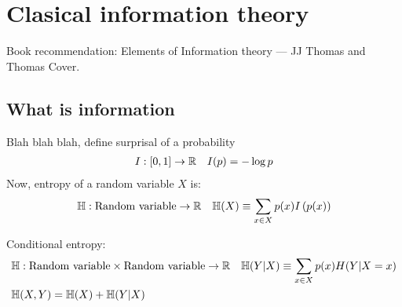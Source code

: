 \chapter{Clasical information theory}
Book recommendation: Elements of Information theory --- JJ Thomas and Thomas Cover.

\section{What is information}
Blah blah blah, define surprisal of a probability 
\begin{align*}
    I: [0, 1] \rightarrow \mathbb{R} \quad
    I(p) = - \log p
\end{align*}
Now, entropy of a random variable $X$ is:
\begin{align*}
    \mathbb{H} : \text{Random variable} \rightarrow \mathbb{R} \quad
    \mathbb{H}(X) \equiv \sum_{x \in X} p(x) I\left(p(x)\right)
\end{align*}

Conditional entropy:
\begin{align*}
    &\mathbb{H} : \text{Random variable} \times \text{Random variable} \rightarrow \mathbb{R} \quad
    \mathbb{H}(Y|X) \equiv \sum_{x \in X} p(x) H(Y|X=x) \\
    &\mathbb{H}(X, Y) = \mathbb{H}(X) + \mathbb{H}(Y|X) 
\end{align*}
